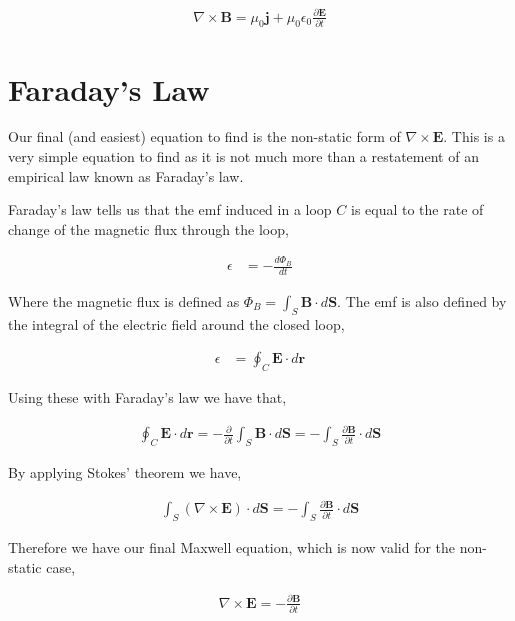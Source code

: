 \documentclass[11pt]{amsart}
\begin{document}
\begin{align*}
  \nabla\times\mathbf{B}=\mu_0\mathbf{j}+\mu_0\epsilon_0\frac{\partial\mathbf{E}}{\partial t}
\end{align*}

\section{Faraday's Law}

Our final (and easiest) equation to find is the non-static form of $\nabla\times\mathbf{E}$. This is a very simple equation to find as it is not much more than a restatement of an empirical law known as Faraday's law.

Faraday's law tells us that the emf induced in a loop $C$ is equal to the rate of change of the magnetic flux through the loop,

\begin{align*}
  \epsilon &= -\frac{d\Phi_B}{dt}
\end{align*}

Where the magnetic flux is defined as $\Phi_B = \int_S\mathbf{B}\cdot d\mathbf{S}$. The emf is also defined by the integral of the electric field around the closed loop,

\begin{align*}
  \epsilon &= \oint_C\mathbf{E}\cdot d\mathbf{r}
\end{align*}

Using these with Faraday's law we have that,

\begin{align*}
  \oint_C\mathbf{E}\cdot d\mathbf{r}=-\frac{\partial}{\partial t}\int_S\mathbf{B}\cdot d\mathbf{S}=-\int_S\frac{\partial\mathbf{B}}{\partial t}\cdot d\mathbf{S}
\end{align*}

By applying Stokes' theorem we have,

\begin{align*}
  \int_S(\nabla\times\mathbf{E})\cdot d\mathbf{S} = -\int_S\frac{\partial\mathbf{B}}{\partial t}\cdot d\mathbf{S}
\end{align*}

Therefore we have our final Maxwell equation, which is now valid for the non-static case,

\begin{align*}
  \nabla\times\mathbf{E}=-\frac{\partial\mathbf{B}}{\partial t}
\end{align*}
\end{document}

